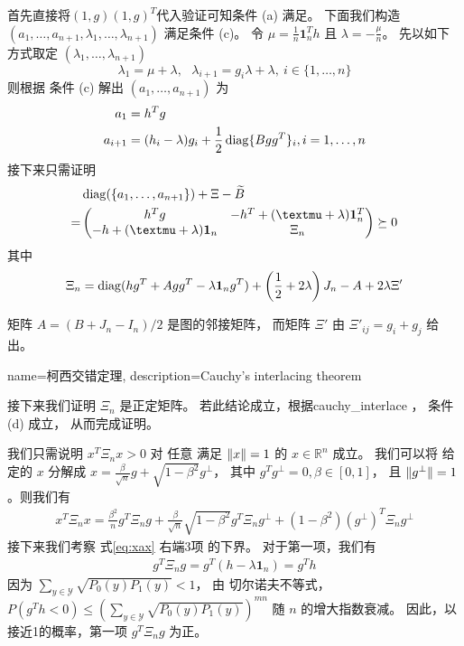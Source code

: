 首先直接将$(1,g)(1,g)^T$代入验证可知条件 (a) 满足。
下面我们构造  $(a_1,\ldots,a_{n+1},\lambda_1,\ldots,\lambda_{n+1})$  满足条件 (c)。
令 $\mu=\frac{1}{n}\mathbf{1}_n^T h$ 且
$\lambda = -\frac{\mu}{n}$。 先以如下方式取定 $(\lambda_1,\ldots,\lambda_{n+1})$
$$
\lambda_1=\mu+\lambda, \text{  }\lambda_{i+1}=g_i\lambda + \lambda,~i\in\{1,\ldots,n\}
$$
则根据 条件 (c) 解出 $(a_1, \dots, a_{n+1})$ 为
\begin{align}
    a_1 &= h^T g \nonumber\\
    a_{i+1} & = (h_i -\lambda)g_i  + \frac{1}{2}\operatorname{diag}\{Bgg^T\}_i, i = 1, \dots, n
\end{align}
接下来只需证明
\begin{align}
    &\diag(\{a_1, \dots, a_{n+1}\}) + \Xi - \widetilde{B} \nonumber\\
    =& \begin{pmatrix} h^T g & -h^T +(\mu + \lambda)\mathbf{1}_n^T \\
        -h+(\mu + \lambda )\mathbf{1}_n & \Xi_n \end{pmatrix}
    \succeq 0
\end{align}
其中
\begin{align}\label{eq:Xi_n}
    \Xi_n =\operatorname{diag}(hg^T + Agg^T -\lambda \mathbf{1}_ng^T)
    + \left(\frac{1}{2} +2\lambda \right)
    J_n  - A + 2\lambda \Xi'
\end{align}

矩阵 $A=(B+J_n-I_n)/2$ 是图的邻接矩阵，
而矩阵 $\Xi'$ 由 $\Xi'_{ij}=g_i + g_j$ 给出。

{name=柯西交错定理,
description={Cauchy's interlacing theorem}}

接下来我们证明 $\Xi_n$ 是正定矩阵。
若此结论成立，根据\gls{cauchy_interlace} \cite{hwang}，
条件 (d) 成立，
从而完成证明。

我们只需说明 $x^T \Xi_n x>0$ 对 任意 满足 $\lVert x\rVert=1$ 的 $x \in \mathbb{R}^n$ 成立。
我们可以将 给定的 $x$ 分解成 $x=\frac{\beta}{\sqrt{n}} g
+ \sqrt{1-\beta^2} g^{\perp}$， 其中 $g^Tg^{\perp}=0, \beta \in [0,1]$，
且 $\lVert g^{\perp}\rVert=1$。则我们有 
\begin{align}\label{eq:xax}
    x^T \Xi_n x = \frac{\beta^2}{n} g^T \Xi_n g  
    +		\frac{\beta}{\sqrt{n}}\sqrt{1-\beta^2} g^T \Xi_n g^{\perp}
    +
    (1-\beta^2)(g^{\perp})^T \Xi_n g^{\perp}
\end{align}
接下来我们考察 式\eqref{eq:xax} 右端3项
的下界。
对于第一项，我们有
\begin{align*}
    g^T \Xi_n g = g^T(h -\lambda \mathbf{1}_n)   = g^T h
\end{align*}
因为 $\sum_{y \in \mathcal{Y}} \sqrt{P_0(y)P_1(y)} < 1$，
由 切尔诺夫不等式， 
$P(g^T h < 0) \leq (\sum_{y \in \mathcal{Y}} \sqrt{P_0(y)P_1(y)})^{mn}$
随 $n$ 的增大指数衰减。
因此，以接近1的概率，第一项 $g^T \Xi_n g$ 为正。


